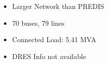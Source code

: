\documentclass[xcolor=svgnames,aspectratio=32,8pt]{beamer}
\begin{document}
\begin{frame}
\begin{changemargin}{-1cm}{-1cm}
\begin{minipage}[!h]{.5\paperwidth}
\begin{itemize}
\item Larger Network than PREDIS
\item 70 buses, 79 lines
\item Connected Load: 5.41 MVA
\item DRES Info not available
\end{itemize}
\end{minipage}

\end{changemargin}
\end{frame}

\end{document}
